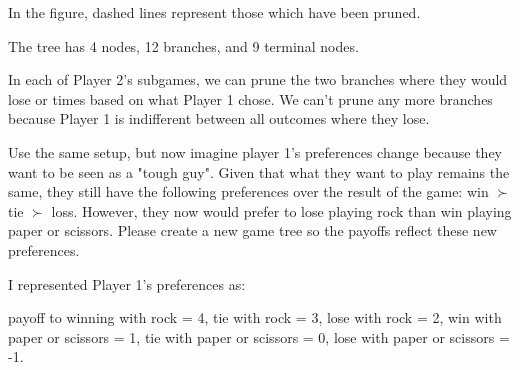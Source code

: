 \documentclass[addpoints ]{exam}
\begin{document}
\begin{questions}

\begin{solution}
  \begin{center}
    
  \end{center}
  
  In the figure, dashed lines represent those which have been pruned.

  The tree has 4 nodes, 12 branches, and 9 terminal nodes.

  In each of Player 2's subgames,
  we can prune the two branches where they would lose or times
  based on what Player 1 chose.
  We can't prune any more branches
  because Player 1 is indifferent between all outcomes where they lose.
\end{solution}

\newpage

Use the same setup, but now imagine player 1's preferences change
because they want to be seen as a "tough guy".
Given that what they want to play remains the same,
they still have the following preferences over the result of the game:
win $\succ$ tie $\succ$ loss.
However, they now would prefer to lose playing rock
than win playing paper or scissors. 
Please create a new game tree so the payoffs reflect these new preferences.


\begin{solution}
  \begin{center}
    
  \end{center}

  I represented Player 1's preferences as:

  payoff to winning with rock = 4,
  tie with rock = 3, 
  lose with rock = 2,
  win with paper or scissors = 1,
  tie with paper or scissors = 0,
  lose with paper or scissors = -1.


\end{solution}
\end{questions}
\end{document}
